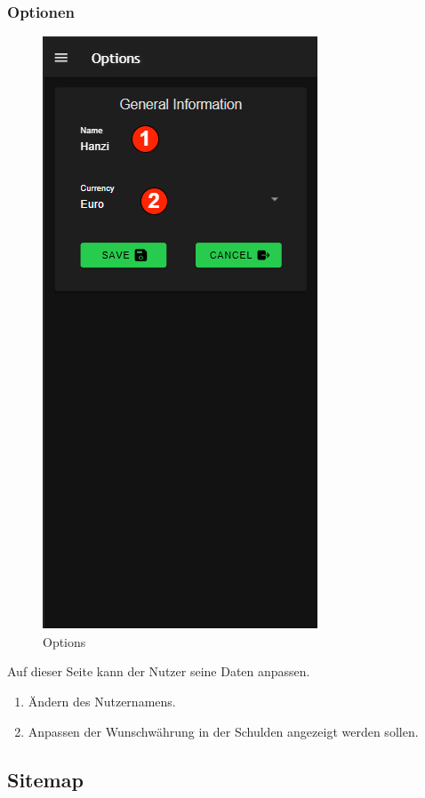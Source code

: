 \subsubsection{Optionen}\label{options}
\begin{figure}[H]
    \centering
    \includegraphics[width=0.3
    \textwidth]{img/pages_numbers/options.drawio}
    \caption[Options]{Options}
    \label{fig:options}
\end{figure}
Auf dieser Seite kann der Nutzer seine Daten anpassen.
\begin{enumerate}[label=\protect\circled{\arabic*}]
	\item Ändern des Nutzernamens.
	\item Anpassen der Wunschwährung in der Schulden angezeigt werden sollen.
\end{enumerate}


\subsection{Sitemap}

